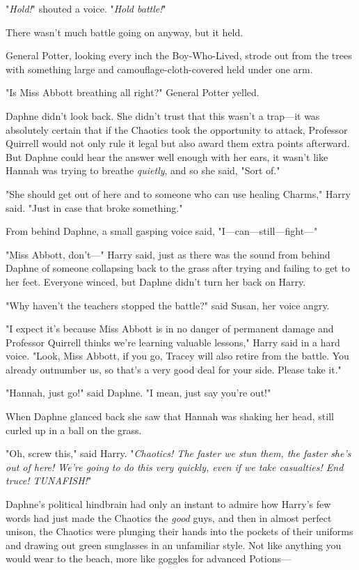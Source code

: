 "\emph{Hold!}" shouted a voice. "\emph{Hold battle!}"

There wasn't much battle going on anyway, but it held.

General Potter, looking every inch the Boy-Who-Lived, strode out from the trees 
with something large and camouflage-cloth-covered held under one arm.

"Is Miss Abbott breathing all right?" General Potter yelled.

Daphne didn't look back. She didn't trust that this wasn't a trap---it was 
absolutely certain that if the Chaotics took the opportunity to attack, 
Professor Quirrell would not only rule it legal but also award them extra 
points afterward. But Daphne could hear the answer well enough with her ears, 
it wasn't like Hannah was trying to breathe \emph{quietly}, and so she said, 
"Sort of."

"She should get out of here and to someone who can use healing Charms," Harry 
said. "Just in case that broke something."

From behind Daphne, a small gasping voice said, "I---can---still---fight---"

"Miss Abbott, don't---" Harry said, just as there was the sound from behind 
Daphne of someone collapsing back to the grass after trying and failing to get 
to her feet. Everyone winced, but Daphne didn't turn her back on Harry.

"Why haven't the teachers stopped the battle?" said Susan, her voice angry.

"I expect it's because Miss Abbott is in no danger of permanent damage and 
Professor Quirrell thinks we're learning valuable lessons," Harry said in a 
hard voice. "Look, Miss Abbott, if you go, Tracey will also retire from the 
battle. You already outnumber us, so that's a very good deal for your side. 
Please take it."

"Hannah, just go!" said Daphne. "I mean, just say you're out!"

When Daphne glanced back she saw that Hannah was shaking her head, still curled 
up in a ball on the grass.

"Oh, screw this," said Harry. "\emph{Chaotics! The faster we stun them, the 
faster she's out of here! We're going to do this very quickly, even if we take 
casualties! End truce! TUNAFISH!}"

Daphne's political hindbrain had only an instant to admire how Harry's few 
words had just made the Chaotics the \emph{good} guys, and then in almost 
perfect unison, the Chaotics were plunging their hands into the pockets of 
their uniforms and drawing out green sunglasses in an unfamiliar style. Not 
like anything you would wear to the beach, more like goggles for advanced 
Potions---

